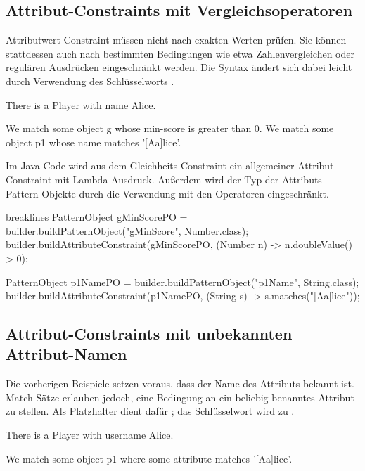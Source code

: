 \subsection{Attribut-Constraints mit Vergleichsoperatoren}

Attributwert-Constraint müssen nicht nach exakten Werten prüfen.
Sie können stattdessen auch nach bestimmten Bedingungen wie etwa Zahlenvergleichen oder regulären Ausdrücken eingeschränkt werden.
Die Syntax ändert sich dabei leicht durch Verwendung des Schlüsselworts .

\begin{mdcodeblock}
    There is a Player with name Alice.

    We match some object g whose min-score is greater than 0.
    We match some object p1 whose name matches '[Aa]lice'.
\end{mdcodeblock}

Im Java-Code wird aus dem Gleichheits-Constraint ein allgemeiner Attribut-Constraint mit Lambda-Ausdruck.
Außerdem wird der Typ der Attributs-Pattern-Objekte durch die Verwendung mit den Operatoren eingeschränkt.

\begin{jcodeblock*}{breaklines}
    PatternObject gMinScorePO = builder.buildPatternObject("gMinScore", Number.class);
    builder.buildAttributeConstraint(gMinScorePO, (Number n) -> n.doubleValue() > 0);

    PatternObject p1NamePO = builder.buildPatternObject("p1Name", String.class);
    builder.buildAttributeConstraint(p1NamePO, (String s) -> s.matches("[Aa]lice"));
\end{jcodeblock*}

\subsection{Attribut-Constraints mit unbekannten Attribut-Namen}

Die vorherigen Beispiele setzen voraus, dass der Name des Attributs bekannt ist.
Match-Sätze erlauben jedoch, eine Bedingung an ein beliebig benanntes Attribut zu stellen.
Als Platzhalter dient dafür ;
das Schlüsselwort  wird zu .

\begin{mdcodeblock}
    There is a Player with username Alice.

    We match some object p1 where some attribute matches '[Aa]lice'.
\end{mdcodeblock}

